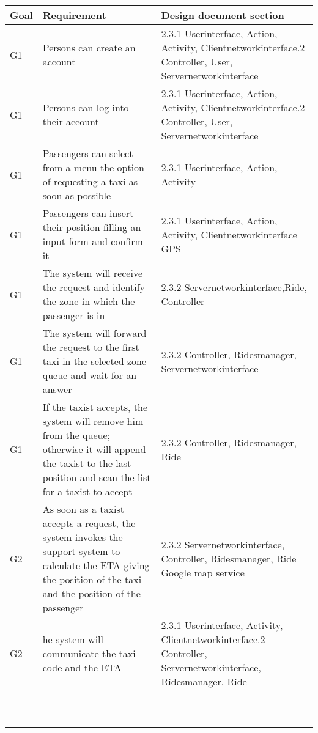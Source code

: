 \begin{center}
 \begin{longtable}{| m{5cm} | m{5cm} | m{5cm} | }
 \hline
  Goal & Requirement & Design document section\\
 \hline\hline
 \endhead
   G1&	Persons can create an account& 2.3.1 Userinterface, Action, Activity, Clientnetworkinterface\newline
					2.3.2 Controller, User, Servernetworkinterface\\ \hline
   G1&	Persons can log into their account& 2.3.1 Userinterface, Action, Activity, Clientnetworkinterface\newline
					      2.3.2 Controller, User, Servernetworkinterface\\ \hline
   G1&	Passengers can select from a menu the option of requesting a taxi as soon as possible& 2.3.1 Userinterface, Action, Activity\\ \hline
   G1&	Passengers can insert their position filling an input form and confirm it& 2.3.1 Userinterface, Action, Activity, Clientnetworkinterface\newline 
										    2.1 GPS \\ \hline
   G1&	The system will receive the request and identify the zone in which the passenger is in	& 2.3.2 Servernetworkinterface,Ride, Controller \\ \hline 
   G1&	The system will forward the request to the first taxi in the selected zone queue and wait for an answer	& 2.3.2 Controller, Ridesmanager, Servernetworkinterface\\ \hline
   G1&	If the taxist accepts, the system will remove him from the queue; otherwise it will append the taxist to the last position and
scan the list for a taxist to accept& 2.3.2 Controller, Ridesmanager, Ride\\ \hline
    G2&	As soon as a taxist accepts a request, the system invokes the support system to calculate the ETA giving the position of the 
	taxi and the position of the passenger& 2.3.2 Servernetworkinterface, Controller, Ridesmanager, Ride \newline
						2.5 Google map service\\ \hline
    G2& he system will communicate the taxi code and the ETA& 2.3.1 Userinterface, Activity, Clientnetworkinterface\newline
								2.3.2 Controller, Servernetworkinterface, Ridesmanager, Ride\\ \hline
     &  & \\ \hline
     &  & \\ \hline
     &  & \\ \hline
     &  & \\ \hline
     &  & \\ \hline
     &  & \\ \hline
     &  & \\ \hline
     &  & \\ \hline
     &  & \\ \hline
     &  & \\ \hline
  \hline
 \end{longtable}
\end{center}
